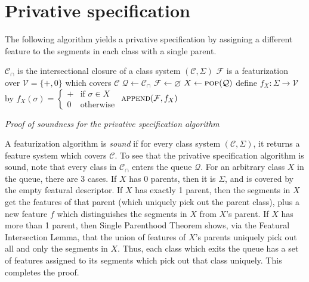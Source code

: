 \documentclass[11pt, oneside]{article}   	%
\begin{document}
 \section{Privative specification}

The following algorithm yields a privative specification by assigning a different feature  to the segments in each class with a single parent.
 
\noindent \begin{algorithmic}
    \REQUIRE $\mathcal C_\cap$ is the intersectional closure of a class system $(\mathcal C, \Sigma)$
    \ENSURE $\mathcal F$ is a featurization over $\mathcal V = \{ +, 0 \}$ which covers $\mathcal C$
    \STATE
    \STATE $\mathcal Q \leftarrow \mathcal C_\cap$
    \STATE $\mathcal F \leftarrow \varnothing$
    \STATE
        \STATE $X \leftarrow \textsc{pop}(\mathcal Q)$
            \STATE define $f_X : \Sigma \rightarrow \mathcal V$ by $f_X(\sigma) = \begin{cases}
                + & \mbox{if } \sigma \in X \\
                0 & \mbox{otherwise}
                \end{cases} $
            \STATE $\textsc{append}(\mathcal F, f_X)$
        \ENDIF
    \ENDWHILE
\end{algorithmic}

\vspace{\baselineskip} \noindent \textit{Proof of soundness for the privative specification algorithm}

A featurization algorithm is \textit{sound} if for every class system $(\mathcal C, \Sigma)$, it returns a feature system which covers $\mathcal C$. To see that the privative specification algorithm is sound, note that every class in $\mathcal C_\cap$ enters the queue $\mathcal Q$. For an arbitrary class $X$ in the queue, there are 3 cases. If $X$ has 0 parents, then it is $\Sigma$, and is covered by the empty featural descriptor. If $X$ has exactly 1 parent, then the segments in $X$ get the features of that parent (which uniquely pick out the parent class), plus a new feature $f$ which distinguishes the segments in $X$ from $X$'s parent. If $X$ has more than 1 parent, then Single Parenthood Theorem shows, via the Featural Intersection Lemma, that the union of features of $X$'s parents uniquely pick out all and only the segments in $X$. Thus, each class which exits the queue has a set of features assigned to its segments which pick out that class uniquely. This completes the proof.
\end{document}

